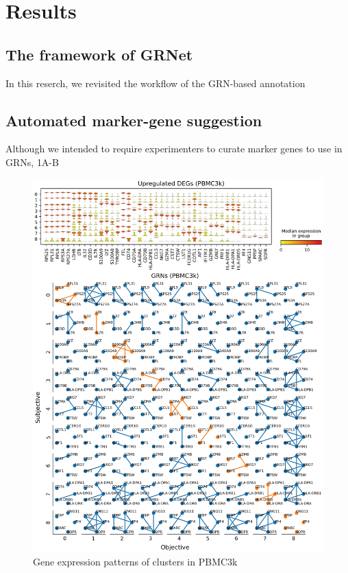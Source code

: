 \documentclass{article}
\begin{document}
\section*{Results}
\subsection*{The framework of GRNet}
In this reserch, we revisited the workflow of the GRN-based annotation

\subsection*{Automated marker-gene suggestion}
Although we intended to require experimenters to curate marker genes to use
in GRNs,
\figurename{ 1A-B}

\begin{figure}[htb]
  \centering
  \includegraphics[scale=0.45]{./figs/exported/figure_s1.png}
  \caption{Gene expression patterns of clusters in PBMC3k}
  \label{fig1}
\end{figure}
\end{document}
